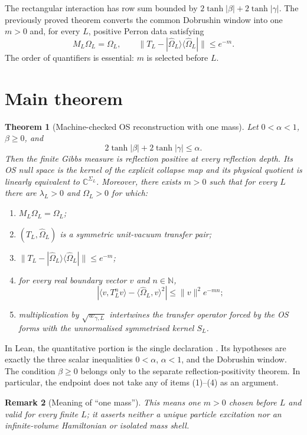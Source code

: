 \documentclass[11pt]{article}
\newtheorem{theorem}{Theorem}[section]
\newtheorem{remark}[theorem]{Remark}
\newcommand{\CC}{\mathbb{C}}
\newcommand{\ip}[2]{\langle #1,#2\rangle}
\newcommand{\norm}[1]{\lVert #1\rVert}
\begin{document}
The rectangular interaction has row sum bounded by
$2\tanh|\beta|+2\tanh|\gamma|$.  The previously proved theorem
 converts the common Dobrushin window
into one $m>0$ and, for every $L$, positive Perron data satisfying
\[
  M_L\Omega_L=\Omega_L,
  \qquad
  \norm{T_L-|\widehat\Omega_L\rangle
                    \langle\widehat\Omega_L|}\le e^{-m}.
\]
The order of quantifiers is essential: $m$ is selected before $L$.

\section{Main theorem}

\begin{theorem}[Machine-checked OS reconstruction with one mass]
\label{thm:main}
Let $0<\alpha<1$, $\beta\geq0$, and
\[
  2\tanh|\beta|+2\tanh|\gamma|\leq\alpha.
\]
Then the finite Gibbs measure is reflection positive at every reflection
depth.  Its OS null space is the kernel of the explicit collapse map and its
physical quotient is linearly equivalent to $\CC^{\Sigma_L}$.  Moreover,
there exists $m>0$ such that for every $L$ there are
$\lambda_L>0$ and $\Omega_L>0$ for which:
\begin{enumerate}
\item $M_L\Omega_L=\Omega_L$;
\item $(T_L,\widehat\Omega_L)$ is a symmetric unit-vacuum transfer pair;
\item
$\norm{T_L-|\widehat\Omega_L\rangle\langle\widehat\Omega_L|}
 \le e^{-m}$;
\item for every real boundary vector $v$ and $n\in\mathbb N$,
\[
 \left|\ip{v}{T_L^n v}
   -\ip{\widehat\Omega_L}{v}^2\right|
 \le \norm{v}^2 e^{-mn};
\]
\item multiplication by $\sqrt{w_{\gamma,L}}$ intertwines the transfer
operator forced by the OS forms with the unnormalised symmetrised kernel
$S_L$.
\end{enumerate}
\end{theorem}

In Lean, the quantitative portion is the single declaration
. Its hypotheses are exactly the
three scalar inequalities $0<\alpha$, $\alpha<1$, and the Dobrushin window.
The condition $\beta\geq0$ belongs only to the separate reflection-positivity
theorem.  In particular, the endpoint does not take any of items (1)--(4) as
an argument.

\begin{remark}[Meaning of ``one mass'']
This means one $m>0$ chosen before $L$ and valid for every finite $L$; it
asserts neither a unique particle excitation nor an infinite-volume
Hamiltonian or isolated mass shell.
\end{remark}
\end{document}
